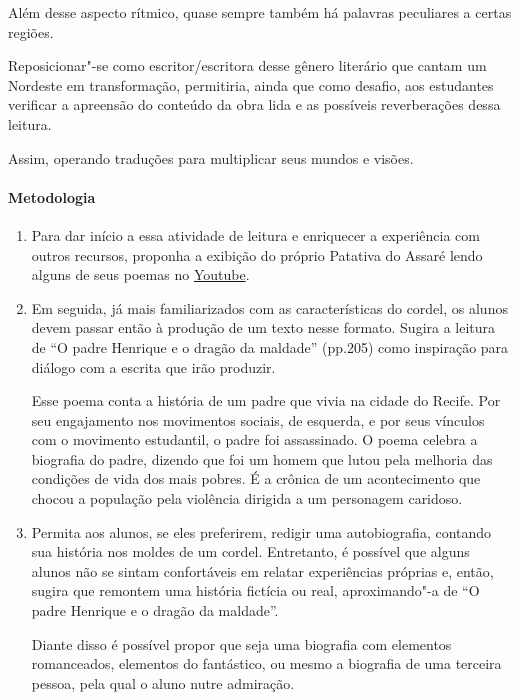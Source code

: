 \documentclass[12pt]{extarticle}
\begin{document}
{Além desse aspecto rítmico, quase sempre também há
palavras peculiares a certas regiões.

Reposicionar"-se como escritor/escritora desse gênero literário que 
cantam um Nordeste em transformação, permitiria, ainda que como desafio, 
aos estudantes verificar a apreensão do conteúdo da obra lida e as 
possíveis reverberações dessa leitura.

Assim, operando traduções para multiplicar seus mundos e visões.

\paragraph{Metodologia}

\begin{enumerate}
\item
Para dar início a essa atividade de leitura e enriquecer a experiência 
com outros recursos, proponha a exibição do próprio Patativa do Assaré 
lendo alguns de seus poemas no \href{https://www.youtube.com/watch?v=RTEfYnMNNpc&ab_channel=IrandiHolanda}{Youtube}.

\item
Em seguida, já mais familiarizados com as características do cordel, os
alunos devem passar então à produção de um texto nesse formato. Sugira a 
leitura de ``O padre Henrique e o dragão da maldade'' (pp.205) como 
inspiração para diálogo com a escrita que irão produzir. 

Esse poema conta a história de um padre que vivia na cidade
do Recife. Por seu engajamento nos movimentos sociais, de
esquerda, e por seus vínculos com o movimento estudantil,
o padre foi assassinado. O poema celebra a biografia do
padre, dizendo que foi um homem que lutou pela melhoria
das condições de vida dos mais pobres. É a crônica de
um acontecimento que chocou a população pela violência
dirigida a um personagem caridoso.

\item
Permita aos alunos, se eles preferirem, redigir uma autobiografia, 
contando sua história nos moldes de um cordel. Entretanto, é possível 
que alguns alunos não se sintam confortáveis em relatar experiências 
próprias e, então, sugira que remontem uma história fictícia ou real, 
aproximando"-a de ``O padre Henrique e o dragão da maldade''.

Diante disso é possível propor que seja uma biografia com elementos
romanceados, elementos do fantástico, ou mesmo a biografia de uma
terceira pessoa, pela qual o aluno nutre admiração. 


\end{enumerate}}
\end{document}

